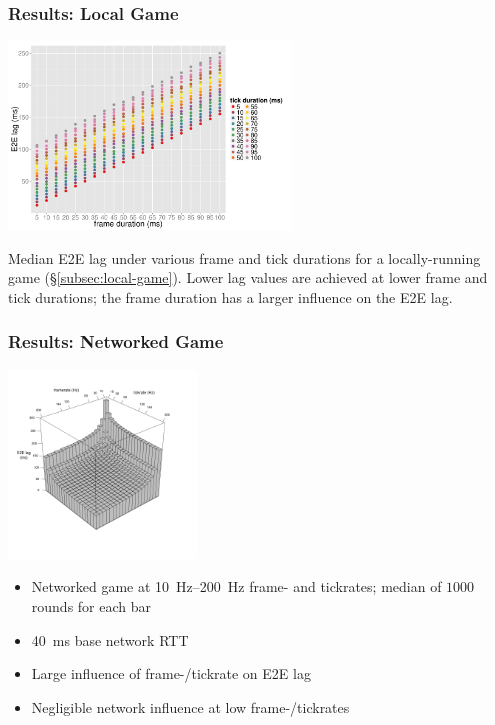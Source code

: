 \documentclass{UDEbeamerEN}
\begin{document}
\begin{frame}
	\frametitle{Results: Local Game}

	\begin{center}
		\includegraphics[height=5cm]{../../../simulation/visualization/nwless-onlinegame-1000rounds.pdf}

		Median \gls{E2E} lag under various frame and tick durations for a locally-running game (§\ref{subsec:local-game}). Lower lag values are achieved at lower frame and tick durations; the frame duration has a larger influence on the \gls{E2E} lag.
	\end{center}
\end{frame}


\begin{frame}
	\frametitle{Results: Networked Game}

	\begin{center}
		\vspace{-9mm}
		\includegraphics[height=5cm]{../../../simulation/visualization/e2e-lag-3dbars.pdf}
		\vspace{-10mm}
	\end{center}

	\begin{itemize}
		\item Networked game at \SIrange{10}{200}{\hertz} frame- and tickrates; median of $1000$ rounds for each bar
		\item \SI{40}{\milli\second} base network RTT
		\item Large influence of frame-/tickrate on E2E lag
		\item Negligible network influence at low frame-/tickrates
	\end{itemize}

\end{frame}
\end{document}
